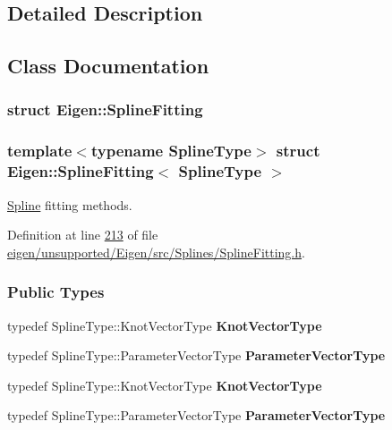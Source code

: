 \subsection{Detailed Description}


\subsection{Class Documentation}
\label{struct_eigen_1_1_spline_fitting}
\subsubsection{struct Eigen\+:\+:Spline\+Fitting}
\subsubsection*{template$<$typename Spline\+Type$>$\newline
struct Eigen\+::\+Spline\+Fitting$<$ Spline\+Type $>$}

\hyperlink{group___splines___module_class_eigen_1_1_spline}{Spline} fitting methods. 

Definition at line \hyperlink{eigen_2unsupported_2_eigen_2src_2_splines_2_spline_fitting_8h_source_l00213}{213} of file \hyperlink{eigen_2unsupported_2_eigen_2src_2_splines_2_spline_fitting_8h_source}{eigen/unsupported/\+Eigen/src/\+Splines/\+Spline\+Fitting.\+h}.

\subsubsection*{Public Types}
\begin{DoxyCompactItemize}
\item 
\mbox{\label{group___splines___module_a4d10d41fbec87890b1695244b1d074be}} 
typedef Spline\+Type\+::\+Knot\+Vector\+Type {\bfseries Knot\+Vector\+Type}
\item 
\mbox{\label{group___splines___module_af7757885fc599a6e0d298d40ca634953}} 
typedef Spline\+Type\+::\+Parameter\+Vector\+Type {\bfseries Parameter\+Vector\+Type}
\item 
\mbox{\label{group___splines___module_a4d10d41fbec87890b1695244b1d074be}} 
typedef Spline\+Type\+::\+Knot\+Vector\+Type {\bfseries Knot\+Vector\+Type}
\item 
\mbox{\label{group___splines___module_af7757885fc599a6e0d298d40ca634953}} 
typedef Spline\+Type\+::\+Parameter\+Vector\+Type {\bfseries Parameter\+Vector\+Type}
\end{DoxyCompactItemize}
